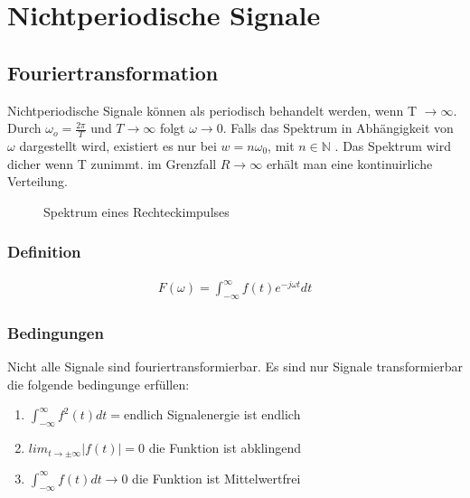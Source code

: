 \documentclass[a4paper,10pt]{article}
\begin{document}
\newpage
\section{Nichtperiodische Signale}
\subsection{Fouriertransformation}

Nichtperiodische Signale können als periodisch behandelt werden, wenn T $\rightarrow \infty$.
Durch $\omega_o = \frac{2\pi}{T}$   und  $T \rightarrow \infty $ folgt $ \omega \rightarrow 0$.
Falls das Spektrum in Abhängigkeit von $\omega$ dargestellt wird, existiert es nur bei $w=n\omega_0$, mit $n \in \mathbb N$ .
Das Spektrum wird dicher wenn T zunimmt. im Grenzfall $R\rightarrow\infty$ erhält man eine kontinuirliche Verteilung.

\begin{figure}[!htb]
\centering
{}
\caption{Spektrum eines Rechteckimpulses}%
\label{rechteckimpuls_spektrum}
\end{figure}


\subsubsection{Definition}

\begin{align}
F(\omega)= \int_{-\infty}^{\infty}f(t)e^{-j\omega t}dt
\end{align}

\subsubsection{Bedingungen}
Nicht alle Signale sind fouriertransformierbar. Es sind nur Signale transformierbar die folgende bedingunge  erfüllen:
\begin{enumerate}
 \item $\int_{-\infty}^{\infty}f^2(t)dt = $endlich	Signalenergie ist endlich
 \item $lim_{t\rightarrow\pm\infty}|f(t)|=0$		die Funktion ist abklingend
 \item $\int_{-\infty}^{\infty}f(t)dt \rightarrow 0$	die Funktion ist Mittelwertfrei
 
\end{enumerate}
\end{document}
